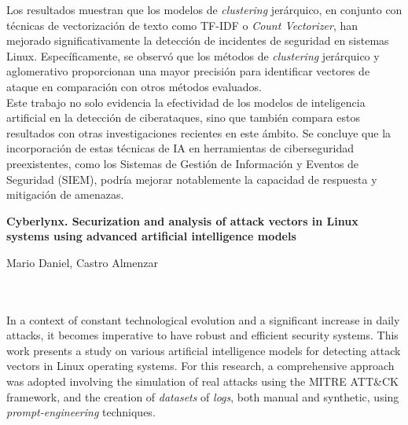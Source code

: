 Los resultados muestran que los modelos de \textit{clustering} jerárquico, en conjunto con técnicas de vectorización de texto como \gls{TF}-\gls{IDF} o \textit{Count Vectorizer}, han mejorado significativamente la detección de incidentes de seguridad en sistemas Linux. Específicamente, se observó que los métodos de \textit{clustering} jerárquico y aglomerativo proporcionan una mayor precisión para identificar vectores de ataque en comparación con otros métodos evaluados. \\

Este trabajo no solo evidencia la efectividad de los modelos de inteligencia artificial en la detección de ciberataques, sino que también compara estos resultados con otras investigaciones recientes en este ámbito. Se concluye que la incorporación de estas técnicas de \gls{IA} en herramientas de ciberseguridad preexistentes, como los Sistemas de Gestión de Información y Eventos de Seguridad (\gls{SIEM}), podría mejorar notablemente la capacidad de respuesta y mitigación de amenazas.


\cleardoublepage


\thispagestyle{empty}


\begin{center}
{\large\bfseries Cyberlynx. Securization and analysis of attack vectors in Linux systems using advanced artificial intelligence models}\\
\end{center}
\begin{center}
Mario Daniel, Castro Almenzar\\
\end{center}

\\

\vspace{0.7cm}
\\

In a context of constant technological evolution and a significant increase in daily attacks, it becomes imperative to have robust and efficient security systems. This work presents a study on various artificial intelligence models for detecting attack vectors in Linux operating systems. For this research, a comprehensive approach was adopted involving the simulation of real attacks using the MITRE \gls{ATT&CK} framework, and the creation of \textit{datasets} of \textit{logs}, both manual and synthetic, using \textit{prompt-engineering} techniques. \\

